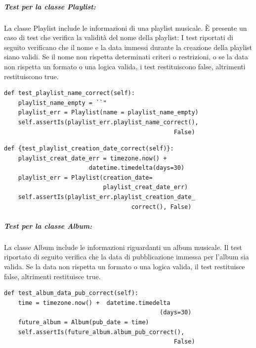 \vspace{5pt}
\subparagraph{Test per la classe \textbf{Playlist:}} La classe Playlist include le informazioni di una playlist musicale. È presente un caso di test che verifica la validità del nome della playlist:
I test riportati di seguito verificano che il nome e la data immessi durante la creazione della playlist siano validi. 
Se il nome non rispetta determinati criteri o restrizioni, o se la data non rispetta un formato o una logica valida, i test restituiscono false, altrimenti restituiscono true.

\vspace{3pt}

\begin{lstlisting}
def test_playlist_name_correct(self):
    playlist_name_empty = ``"
    playlist_err = Playlist(name = playlist_name_empty)
    self.assertIs(playlist_err.playlist_name_correct(), 
                                                False)
\end{lstlisting} 

\vspace{3pt}
\begin{lstlisting}
def {test_playlist_creation_date_correct(self)}:
    playlist_creat_date_err = timezone.now() + 
                        datetime.timedelta(days=30)
    playlist_err = Playlist(creation_date=
                            playlist_creat_date_err)
    self.assertIs(playlist_err.playlist_creation_date_
                                    correct(), False)
\end{lstlisting} 



\newpage
\subparagraph{Test per la classe \textbf{Album:}} La classe Album include le informazioni riguardanti un album musicale. 
Il test riportato di seguito verifica che la data di pubblicazione immessa per l'album sia valida. 
Se la data non rispetta un formato o una logica valida, il test restituisce false, altrimenti restituisce true.
\vspace{3pt}

\begin{lstlisting}
def test_album_data_pub_correct(self):
    time = timezone.now() +  datetime.timedelta
                                            (days=30)
    future_album = Album(pub_date = time)
    self.assertIs(future_album.album_pub_correct(), 
                                                False)
\end{lstlisting} 

